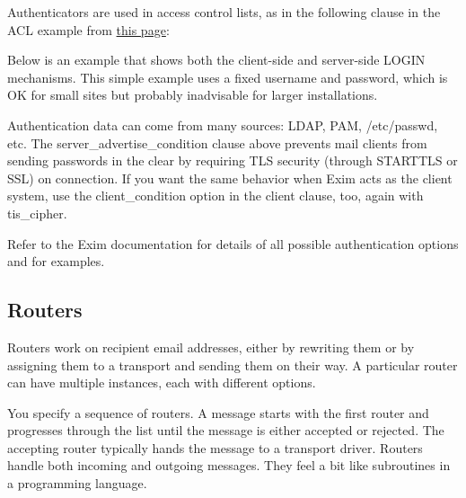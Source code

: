 Authenticators are used in access control lists, as in the following
clause in the ACL example from
\protect\hyperlink{part0026_split_047.htmlux5cux23_idTextAnchor1141}{this
page}:


Below is an example that shows both the client-side and server-side
LOGIN mechanisms. This simple example uses a fixed username and
password, which is OK for small sites but probably inadvisable for
larger installations.


\protect\hypertarget{part0026_split_049.htmlux5cux23_idIndexMarker2653}{}{}Authentication
data can come from many sources: LDAP, PAM, {/etc/passwd}, etc. The
{server\_advertise\_condition} clause above prevents mail clients from
sending passwords in the clear by requiring TLS security (through
STARTTLS or SSL) on connection. If you want the same behavior when Exim
acts as the client system, use the {client\_condition} option in the
client clause, too, again with {tis\_cipher}.

Refer to the Exim documentation for details of all possible
authentication options and for examples.

\protect\hypertarget{part0026_split_050.html}{}{}

\hypertarget{part0026_split_050.htmlux5cux23_idContainer1247}{}
\hypertarget{part0026_split_050.htmlux5cux23calibre_pb_49}{%
\subsection[Routers]{\texorpdfstring{R\protect\hypertarget{part0026_split_050.htmlux5cux23_idTextAnchor1146}{}{}outers}{Routers}}\label{part0026_split_050.htmlux5cux23calibre_pb_49}}

\protect\hypertarget{part0026_split_050.htmlux5cux23_idIndexMarker2654}{}{}Routers
work on recipient email addresses, either by rewriting them or by
assigning them to a transport and sending them on their way. A
particular router can have multiple instances, each with different
options.

You specify a sequence of routers. A message starts with the first
router and progresses through the list until the message is either
accepted or rejected. The accepting router typically hands the message
to a transport driver. Routers handle both incoming and outgoing
messages. They feel a bit like subroutines in a programming language.

